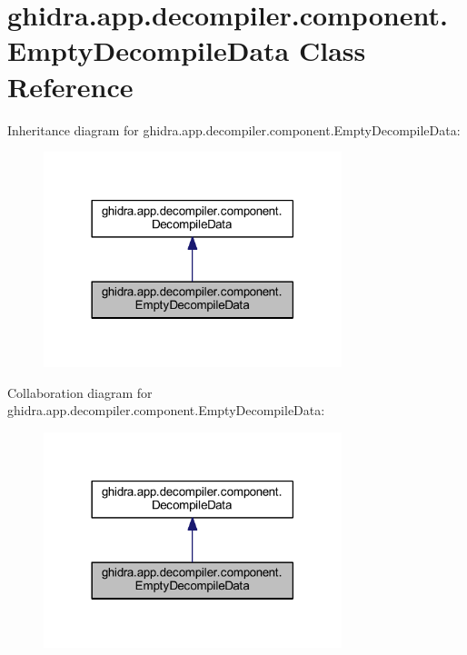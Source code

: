 \hypertarget{classghidra_1_1app_1_1decompiler_1_1component_1_1_empty_decompile_data}{}\section{ghidra.\+app.\+decompiler.\+component.\+Empty\+Decompile\+Data Class Reference}
\label{classghidra_1_1app_1_1decompiler_1_1component_1_1_empty_decompile_data}


Inheritance diagram for ghidra.\+app.\+decompiler.\+component.\+Empty\+Decompile\+Data\+:
\nopagebreak
\begin{figure}[H]
\begin{center}
\leavevmode
\includegraphics[width=246pt]{classghidra_1_1app_1_1decompiler_1_1component_1_1_empty_decompile_data__inherit__graph}
\end{center}
\end{figure}


Collaboration diagram for ghidra.\+app.\+decompiler.\+component.\+Empty\+Decompile\+Data\+:
\nopagebreak
\begin{figure}[H]
\begin{center}
\leavevmode
\includegraphics[width=246pt]{classghidra_1_1app_1_1decompiler_1_1component_1_1_empty_decompile_data__coll__graph}
\end{center}
\end{figure}
